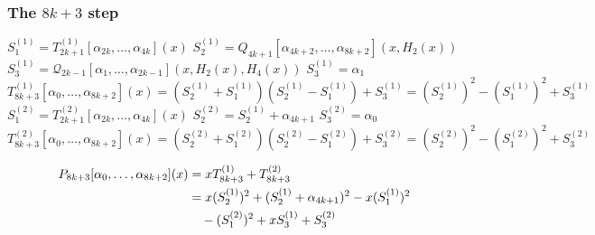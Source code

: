 \subsubsection{The \texorpdfstring{$8k+3$}{8k+3} step}
\begin{algorithm}[H]
    \caption{
        Extending a compatible joint realization from $2k+1$ to $8k+3$.
        The call to $\mathcal Q_{2k-1}$ below uses the selected gadget of
        : it needs only the $H_2,H_4$ made
        derivable by the preceding two calls (with the explicit $Q_3,Q_7$
        bases in the small cases).
    }
    \label{alg:constr-8k+3}

    \begin{algorithmic}
        \State $S^{(1)}_1 = T^{(1)}_{2k + 1}[\alpha_{2k}, \ldots, \alpha_{4k}](x)$ 
        \State $S^{(1)}_2 = Q_{4k + 1}[\alpha_{4k + 2}, \ldots, \alpha_{8k + 2}](x, H_2(x))$ 
            \State $S^{(1)}_3 = \mathcal Q_{2k - 1}[\alpha_{1}, \ldots, \alpha_{2k - 1}](x, H_2(x), H_4(x))$
        \Else
            \State $S^{(1)}_3 = \alpha_1$
        \EndIf
        \State $T^{(1)}_{8k + 3}[\alpha_0, \ldots, \alpha_{8k + 2}](x)
            = (S^{(1)}_2 + S^{(1)}_1)(S^{(1)}_2 - S^{(1)}_1) + S^{(1)}_3
            = (S^{(1)}_2)^2 - (S^{(1)}_1)^2 + S^{(1)}_3$
        \\
        \State $S^{(2)}_1 = T^{(2)}_{2k + 1}[\alpha_{2k}, \ldots, \alpha_{4k}](x)$
        \State $S^{(2)}_2 = S^{(1)}_2 + \alpha_{4k + 1}$
        \State $S^{(2)}_3 = \alpha_{0}$
        \State $T^{(2)}_{8k + 3}[\alpha_0, \ldots, \alpha_{8k + 2}](x)
            = (S^{(2)}_2 + S^{(2)}_1)(S^{(2)}_2 - S^{(2)}_1) + S^{(2)}_3
            = (S^{(2)}_2)^2 - (S^{(2)}_1)^2 + S^{(2)}_3$

        \State \begin{align}
            P_{8k + 3}[\alpha_0, \ldots, \alpha_{8k + 2}](x)
            &= x T^{(1)}_{8k + 3} + T^{(2)}_{8k + 3}
            \\&=x(S^{(1)}_2)^2+(S^{(1)}_2+\alpha_{4k+1})^2
                 -x(S^{(1)}_1)^2\notag\\
            &\quad -(S^{(2)}_1)^2+xS^{(1)}_3+S^{(2)}_3
        \end{align}
    \end{algorithmic}
\end{algorithm}

